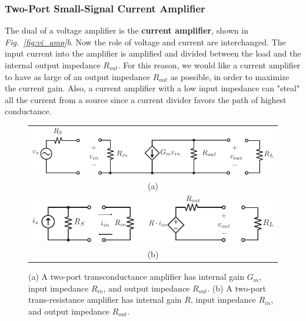 \subsubsection{Two-Port Small-Signal Current Amplifier}
The dual of a voltage amplifier is the \textbf{current amplifier}, shown in \emph{Fig.~\ref{fig:vi_amp}b}.  Now the role of voltage and current are interchanged. The input current into the amplifier is amplified and divided between the load and the internal output impedance $R_{out}$.  For this reason, we would like a current amplifier to have as large of an output impedance $R_{out}$ as possible, in order to maximize the current gain.  Also, a current amplifier with a low input impedance can "steal" all the current from a source since a current divider favors the path of highest conductance.
\begin{figure}[H]
\centering
\begin{tabular}{c}
\includegraphics[width=.9\columnwidth]{gmamp}\\
(a)\\
\includegraphics[width=.9\columnwidth]{ramp}\\
(b)\\
\end{tabular}
\caption{(a) A two-port transconductance amplifier has internal gain $G_m$, input impedance $R_{in}$, and output impedance $R_{out}$.  (b) A two-port trans-resistance amplifier has internal gain $R$, input impedance $R_{in}$, and output impedance $R_{out}$.}
\label{fig:gm_z_amp}
\end{figure}
\newpage
